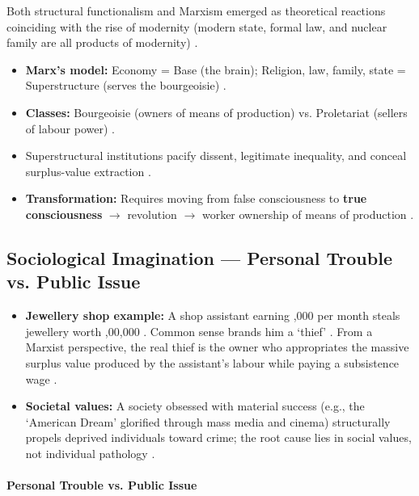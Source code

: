 \begin{ComparisonBox}
Both structural functionalism and Marxism emerged as theoretical reactions coinciding with the rise of modernity (modern state, formal law, and nuclear family are all products of modernity) .
\end{ComparisonBox}

\begin{QuickRevision}
\begin{itemize}
    \item \textbf{Marx's model:} Economy = Base (the brain); Religion, law, family, state = Superstructure (serves the bourgeoisie) .
    \item \textbf{Classes:} Bourgeoisie (owners of means of production) vs. Proletariat (sellers of labour power) .
    \item Superstructural institutions pacify dissent, legitimate inequality, and conceal surplus-value extraction .
    \item \textbf{Transformation:} Requires moving from false consciousness to \textbf{true consciousness} $\rightarrow$ revolution $\rightarrow$ worker ownership of means of production .
\end{itemize}
\end{QuickRevision}

\subsection{Sociological Imagination --- Personal Trouble vs. Public Issue}

\begin{ExampleBox}
\begin{itemize}
    \item \textbf{Jewellery shop example:} A shop assistant earning ,000 per month steals jewellery worth ,00,000 . Common sense brands him a `thief' . From a Marxist perspective, the real thief is the owner who appropriates the massive surplus value produced by the assistant's labour while paying a subsistence wage .
    \item \textbf{Societal values:} A society obsessed with material success (e.g., the `American Dream' glorified through mass media and cinema) structurally propels deprived individuals toward crime; the root cause lies in social values, not individual pathology .
\end{itemize}
\end{ExampleBox}

\paragraph{Personal Trouble vs. Public Issue}

